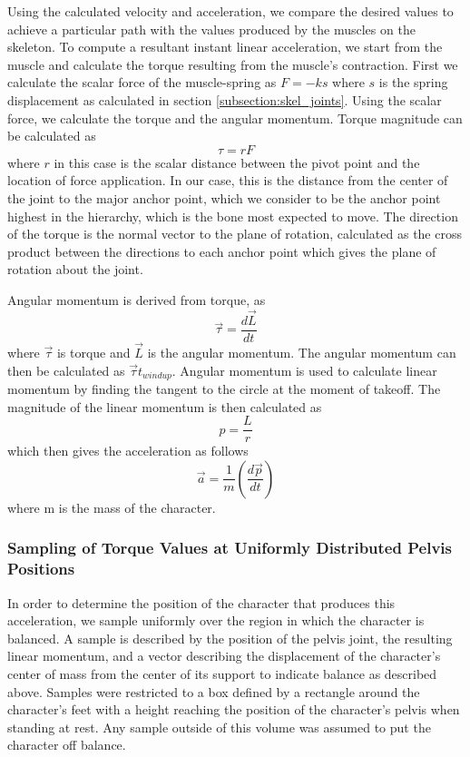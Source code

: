 Using the calculated velocity and acceleration, we compare the desired values to achieve a particular path with the values produced by the muscles on the skeleton.  To compute a resultant instant linear acceleration, we start from the muscle and calculate the torque resulting from the muscle's contraction.  First we calculate the scalar force of the muscle-spring as $F = -k s$ where $s$ is the spring displacement as calculated in section \ref{subsection:skel_joints}.  Using the scalar force, we calculate the torque and the angular momentum.  Torque magnitude can be calculated as \[\tau = r F\] where $r$ in this case is the scalar distance between the pivot point and the location of force application.  In our case, this is the distance from the center of the joint to the major anchor point, which we consider to be the anchor point highest in the hierarchy, which is the bone most expected to move.  The direction of the torque is the normal vector to the plane of rotation, calculated as the cross product between the directions to each anchor point which gives the plane of rotation about the joint.

Angular momentum is derived from torque, as \[\vec{\tau} = \dfrac{d\vec{L}}{dt}\] where $\vec{\tau}$ is torque and $\vec{L}$ is the angular momentum.  The angular momentum can then be calculated as $\vec{\tau} t_{windup}$.  Angular momentum is used to calculate linear momentum by finding the tangent to the circle at the moment of takeoff.  The magnitude of the linear momentum is then calculated as \[p = \frac{L}{r}\] which then gives the acceleration as follows \[ \vec{a} = \frac{1}{m}\left(\dfrac{d\vec{p}}{dt}\right)\] where m is the mass of the character.

\subsubsection{Sampling of Torque Values at Uniformly Distributed Pelvis Positions}
\label{subsubsection:torque_sample}

In order to determine the position of the character that produces this acceleration, we sample uniformly over the region in which the character is balanced.   A sample is described by the position of the pelvis joint, the resulting linear momentum, and a vector describing the displacement of the character's center of mass from the center of its support to indicate balance as described above.  Samples were restricted to a box defined by a rectangle around the character's feet with a height reaching the position of the character's pelvis when standing at rest.  Any sample outside of this volume was assumed to put the character off balance.  


